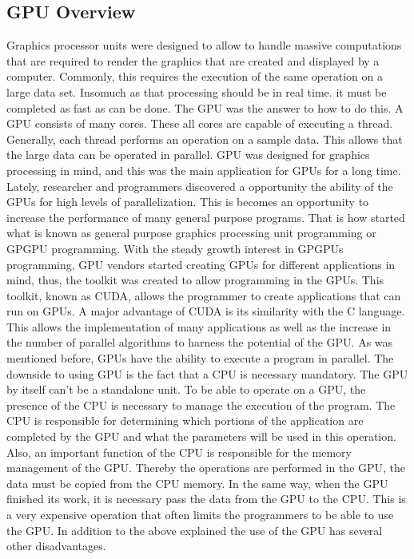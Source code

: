 \documentclass[Ingles]{ic-tese-v1}
\begin{document}
\subsection{GPU Overview}
Graphics processor units were designed to allow to handle massive computations
that are required to render the graphics that are created and displayed by a computer.
Commonly, this requires the execution of the same operation on a large data set. Insomuch as that processing should be in real time. it must be completed as
fast as can be done. The GPU was the answer to how to do this. A GPU consists of many cores. These all cores are capable of executing a thread.
Generally, each thread performs an operation on a sample data. This allows that the large data can be operated in parallel.
GPU was designed for graphics processing in mind, and this was the main application for GPUs
for a long time. Lately, researcher and programmers discovered a opportunity the ability of the GPUs for high levels of parallelization. This is becomes an opportunity to increase the performance of many general purpose programs.
That is how started what is known as general purpose graphics processing unit programming or GPGPU programming. With the steady growth interest in GPGPUs programming, GPU vendors started creating GPUs for different applications in mind, thus, the toolkit was created to allow programming in the GPUs. This toolkit, known as CUDA, allows the programmer to create applications that can run on GPUs. A major advantage of CUDA is its similarity with the C language. This allows the implementation of many applications as well as the increase in the number of parallel algorithms to harness the potential of the GPU. As was mentioned before, GPUs have the ability to execute a program in parallel. The downside to using GPU is the fact that a CPU is necessary mandatory. The GPU by itself can't be a standalone unit. To be able to operate on a GPU, the presence of the CPU is necessary to manage the execution of the program. The CPU is responsible for determining which portions of the application are completed by the GPU and what the parameters will be used in this operation. Also, an important function of the CPU is responsible for the memory management of the GPU. Thereby the operations are performed in the GPU, the data must be copied from the CPU memory. In the same way, when the GPU finished its work, it is necessary pass the data from the GPU to the CPU. This is a very expensive operation that often limits the programmers to be able to use the GPU.
In addition to the above explained the use of the GPU has several other disadvantages.
\end{document}
